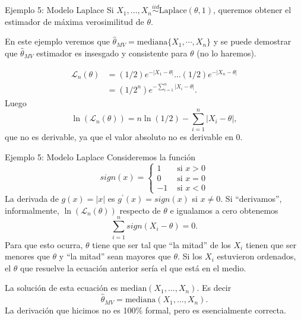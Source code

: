 \documentclass{beamer}
\theoremstyle{definition}
\begin{document}
\begin{frame}{\color{rosee}Ejemplo 5: Modelo Laplace}
  \small
    Si $X_{1},\dots,X_{n}\stackrel{iid}{\sim}\text{Laplace}(\theta,1)$, queremos obtener el
    estimador de m\'axima verosimilitud de $\theta$. 
    
    En este ejemplo veremos que $\widehat{\theta}_{MV}=\text{mediana}\{X_1,\cdots, X_n\}$ y se puede demostrar que $\widehat{\theta
    }_{MV} $ estimador es insesgado y consistente para $\theta$ (no lo haremos).
    
    
    \begin{align*}
      \mathcal{L}_{n}(\theta)
      &=(1/2)e^{-\vert X_{1} - \theta\vert}  \dots (1/2)e^{-\vert X_{n} - \theta\vert}
      \\
      &=(1/2^{n}) e^{- \sum_{i=1}^{n}\vert X_{i} - \theta\vert}.
    \end{align*}
    Luego
    $$
    \ln(\mathcal{L}_{n}(\theta))= n \ln(1/2) - \sum_{i=1}^{n}\vert X_{i} - \theta\vert,
    $$
    que no es derivable, ya que el valor absoluto no es derivable en 0.
  
\end{frame}

  
  \begin{frame}{\color{rosee}Ejemplo 5: Modelo Laplace}
\small
Consideremos la funci\'on 
\[sign(x)=\begin{cases}
1  &\text{ si } x>0\\
0 & \text{ si } x=0\\
-1 &\text{ si } x<0\end{cases}\]  
    La derivada de $g(x)=\vert x\vert$ es
    $g^{\prime}(x)=sign(x)$ si $x\neq 0$. Si ``derivamos'', informalmente,
    $\ln(\mathcal{L}_{n}(\theta))$ respecto de $\theta$ e igualamos a
    cero obtenemos
    $$
    \sum_{i=1}^{n} sign\left(X_{i} - \theta\right)=0.
    $$
    Para que esto ocurra, $\theta$ tiene que ser tal que ``la mitad'' de
    los $X_{i}$ tienen que ser menores que $\theta$ y ``la mitad'' sean
    mayores que $\theta$. Si los $X_{i}$ estuvieron ordenados, el
    $\theta$ que resuelve la ecuaci\'on anterior ser\'ia el que est\'a
    en el medio.
  

    La soluci\'on de esta ecuaci\'on es
    $\text{median}(X_{1},\dots,X_{n})$. Es decir
    $$
    \widehat{\theta}_{MV}=\text{mediana}(X_{1},\dots,X_{n}).
    $$
    La derivaci\'on que hicimos no es 100\% formal, pero es
    esencialmente correcta.
  
\end{frame}
\end{document}
